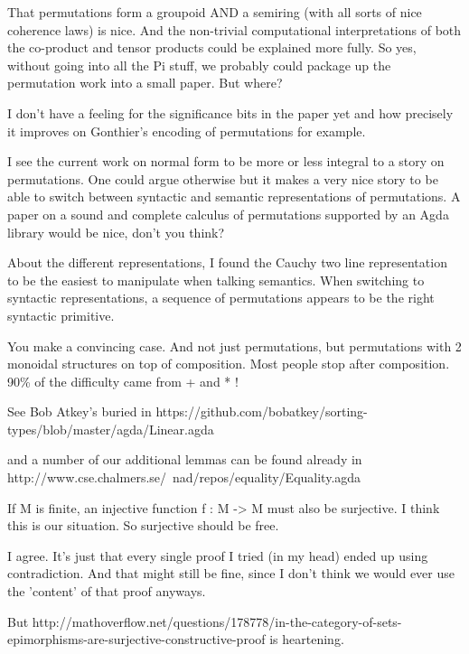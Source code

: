 

That permutations form a groupoid AND a semiring (with all sorts of nice coherence laws) is nice.  And the non-trivial computational interpretations of both the co-product and tensor products could be explained more fully.  So yes, without going into all the Pi stuff, we probably could package up the permutation work into a small paper.  But where?

I don’t have a feeling for the significance bits in the paper yet and how precisely it improves on Gonthier’s encoding of permutations for example.

I see the current work on normal form to be more or less integral to a story on permutations. One could argue otherwise but it makes a very nice story to be able to switch between syntactic and semantic representations of permutations. A paper on a sound and complete calculus of permutations supported by an Agda library would be nice, don’t you think? 

About the different representations, I found the Cauchy two line representation to be the easiest to manipulate when talking semantics. When switching to syntactic representations, a sequence of permutations appears to be the right syntactic primitive. 

You make a convincing case.  And not just permutations, but permutations with 2 monoidal structures on top of composition.  Most people stop after composition.  90\% of the difficulty came from + and * !

See Bob Atkey's buried in
https://github.com/bobatkey/sorting-types/blob/master/agda/Linear.agda

and a number of our additional lemmas can be found already in
http://www.cse.chalmers.se/~nad/repos/equality/Equality.agda

If M is finite, an injective function f : M -> M must also be surjective. I think this is our situation. So surjective should be free. 

I agree.  It's just that every single proof I tried (in my head) ended up using contradiction.  And that might still be fine, since I don't think we would ever use the 'content' of that proof anyways.

But
http://mathoverflow.net/questions/178778/in-the-category-of-sets-epimorphisms-are-surjective-constructive-proof
is heartening.

